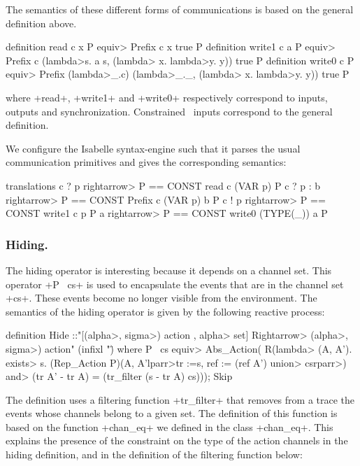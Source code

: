 \documentclass[11pt,a4paper]{article}
\begin{document}
The semantics of these different forms of communications is based on the general definition above.
\begin{isar}
definition read c x P  \<equiv>   Prefix c x true P
definition write1 c a P \<equiv>    Prefix c (\<lambda>s. a s, (\<lambda> x. \<lambda>y. y)) true P
definition write0 c P \<equiv>    Prefix (\<lambda>_.c) (\<lambda>_._, (\<lambda> x. \<lambda>y. y)) true P
\end{isar}
where \inlineisar+read+, \inlineisar+write1+ and \inlineisar+write0+ respectively correspond to 
inputs, outputs and synchronization. Constrained~ inputs correspond to the general definition. 

We configure the Isabelle syntax-engine such that it parses the usual
communication primitives and gives the corresponding semantics:
\begin{isar}
translations
  c ? p \<rightarrow> P      == CONST read c (VAR p) P
  c ? p : b \<rightarrow> P  == CONST Prefix c (VAR p) b P
  c ! p \<rightarrow> P      == CONST write1 c p P
  a \<rightarrow> P          == CONST write0 (TYPE(_)) a P
\end{isar}

\subsubsection{Hiding.}
The hiding operator is interesting because it depends on a channel set. This operator 
\inlineisar+P \ cs+ is used to encapsulate the events that are in the channel set \inlineisar+cs+. 
These events become no longer visible from the environment. The semantics of the hiding operator is 
given by the following reactive process:

\begin{isar}
definition
Hide ::"[(\<alpha>, \<sigma>) action , \<alpha>    set] \<Rightarrow> (\<alpha>, \<sigma>) action" (infixl "\")
where  
P \ cs \<equiv>  Abs_Action( R(\<lambda> (A, A'). 
           \<exists> s. (Rep_Action P)(A, A'\<lparr>tr :=s, ref := (ref A') \<union>       cs\<rparr>) 
               \<and> (tr A' - tr A) = (tr_filter (s - tr A) cs))); Skip
\end{isar}

The definition uses a filtering function \inlineisar+tr_filter+ that removes from a trace the events 
whose channels belong to a given set. The definition of this function is based on the function 
\inlineisar+chan_eq+ we defined in the class \inlineisar+chan_eq+. This explains the presence of the 
constraint on the type of the action channels in the hiding definition, and in the definition of the 
filtering function below:
\end{document}
